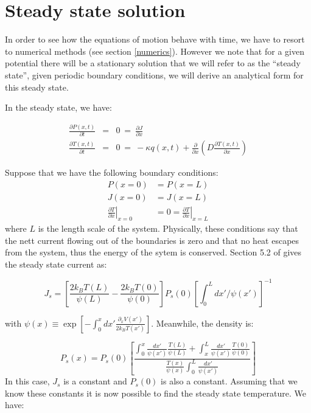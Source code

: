 \section{Steady state solution} \label{SteadyState}
In order to see how the equations of motion behave with time, we have to resort to numerical methods (see section \ref{numerics}). However we note that for a given potential there will be a stationary solution that we will refer to as the ``steady state'', given periodic boundary conditions, we will derive an analytical form for this steady state.

In the steady state, we have:

\begin{eqnarray}
\frac{\partial P(x, t)}{\partial t} &=&  0 \ = \ \frac{\partial J}{\partial x} \label{eqn:SmoluchowskiSteady} \\
\frac{\partial T(x, t)}{\partial t} &=& 0 \ = \ -\kappa q(x,t) + \frac{\partial}{\partial x} \left ( D \frac{\partial T(x, t)}{\partial x} \right ) \label{eqn:TemperatureSteady}
\end{eqnarray}

Suppose that we have the following boundary conditions:
\begin{align}
P(x = 0) & = P(x = L) \\
J(x = 0) & = J(x = L) \\
\left. \frac{\partial T}{\partial x} \right \rvert_{x = 0} & = 0 = \left. \frac{\partial T}{\partial x} \right \rvert_{x = L} \label{eqn:temperatureBoundary}
\end{align}
where $L$ is the length scale of the system. Physically, these conditions say that the nett current flowing out of the boundaries is zero and that no heat escapes from the system, thus the energy of the sytem is conserved. Section 5.2 of \cite{Gardiner2009} gives the steady state current as:

\begin{equation}
J_s = \left [\frac{2 k_B T(L)}{\psi(L)} - \frac{2 k_B T(0)}{\psi(0)}  \right] P_s(0) \left [\int_0^L dx'/\psi(x') \right]^{-1}
\label{eqn:SteadyCurrent}
\end{equation}

with $\psi(x) \equiv \exp[-\int_0^x dx' \frac{\partial_x V(x')}{2 k_B T(x')}]$. Meanwhile, the density is:

\begin{equation}
P_s(x) = P_s(0) \left [\frac{\int_0^x \frac{dx'}{\psi(x')} \frac{T(L)}{\psi(L)} + \int_x^L \frac{dx'}{\psi(x')} \frac{T(0)}{\psi(0)} }{\frac{T(x)}{\psi(x)} \int_0^L \frac{dx'}{\psi(x')} } \right]
\label{eqn:SteadyDensity}
\end{equation}
In this case, $J_s$ is a constant and $P_s(0)$ is also a constant. Assuming that we know these constants it is now possible to find the steady state temperature. We have:

